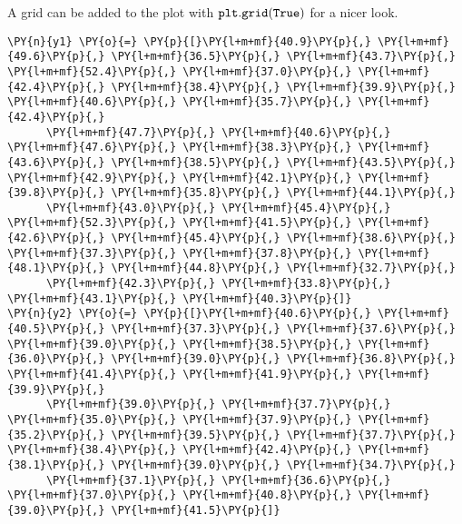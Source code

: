A grid can be added to the plot with \(\tt{plt.grid(True)}\) for a nicer
look.

    \begin{tcolorbox}[breakable, size=fbox, boxrule=1pt, pad at break*=1mm,colback=cellbackground, colframe=cellborder]
\begin{Verbatim}[commandchars=\\\{\}]
\PY{n}{y1} \PY{o}{=} \PY{p}{[}\PY{l+m+mf}{40.9}\PY{p}{,} \PY{l+m+mf}{49.6}\PY{p}{,} \PY{l+m+mf}{36.5}\PY{p}{,} \PY{l+m+mf}{43.7}\PY{p}{,} \PY{l+m+mf}{52.4}\PY{p}{,} \PY{l+m+mf}{37.0}\PY{p}{,} \PY{l+m+mf}{42.4}\PY{p}{,} \PY{l+m+mf}{38.4}\PY{p}{,} \PY{l+m+mf}{39.9}\PY{p}{,} \PY{l+m+mf}{40.6}\PY{p}{,} \PY{l+m+mf}{35.7}\PY{p}{,} \PY{l+m+mf}{42.4}\PY{p}{,} 
      \PY{l+m+mf}{47.7}\PY{p}{,} \PY{l+m+mf}{40.6}\PY{p}{,} \PY{l+m+mf}{47.6}\PY{p}{,} \PY{l+m+mf}{38.3}\PY{p}{,} \PY{l+m+mf}{43.6}\PY{p}{,} \PY{l+m+mf}{38.5}\PY{p}{,} \PY{l+m+mf}{43.5}\PY{p}{,} \PY{l+m+mf}{42.9}\PY{p}{,} \PY{l+m+mf}{42.1}\PY{p}{,} \PY{l+m+mf}{39.8}\PY{p}{,} \PY{l+m+mf}{35.8}\PY{p}{,} \PY{l+m+mf}{44.1}\PY{p}{,} 
      \PY{l+m+mf}{43.0}\PY{p}{,} \PY{l+m+mf}{45.4}\PY{p}{,} \PY{l+m+mf}{52.3}\PY{p}{,} \PY{l+m+mf}{41.5}\PY{p}{,} \PY{l+m+mf}{42.6}\PY{p}{,} \PY{l+m+mf}{45.4}\PY{p}{,} \PY{l+m+mf}{38.6}\PY{p}{,} \PY{l+m+mf}{37.3}\PY{p}{,} \PY{l+m+mf}{37.8}\PY{p}{,} \PY{l+m+mf}{48.1}\PY{p}{,} \PY{l+m+mf}{44.8}\PY{p}{,} \PY{l+m+mf}{32.7}\PY{p}{,} 
      \PY{l+m+mf}{42.3}\PY{p}{,} \PY{l+m+mf}{33.8}\PY{p}{,} \PY{l+m+mf}{43.1}\PY{p}{,} \PY{l+m+mf}{40.3}\PY{p}{]}
\PY{n}{y2} \PY{o}{=} \PY{p}{[}\PY{l+m+mf}{40.6}\PY{p}{,} \PY{l+m+mf}{40.5}\PY{p}{,} \PY{l+m+mf}{37.3}\PY{p}{,} \PY{l+m+mf}{37.6}\PY{p}{,} \PY{l+m+mf}{39.0}\PY{p}{,} \PY{l+m+mf}{38.5}\PY{p}{,} \PY{l+m+mf}{36.0}\PY{p}{,} \PY{l+m+mf}{39.0}\PY{p}{,} \PY{l+m+mf}{36.8}\PY{p}{,} \PY{l+m+mf}{41.4}\PY{p}{,} \PY{l+m+mf}{41.9}\PY{p}{,} \PY{l+m+mf}{39.9}\PY{p}{,} 
      \PY{l+m+mf}{39.0}\PY{p}{,} \PY{l+m+mf}{37.7}\PY{p}{,} \PY{l+m+mf}{35.0}\PY{p}{,} \PY{l+m+mf}{37.9}\PY{p}{,} \PY{l+m+mf}{35.2}\PY{p}{,} \PY{l+m+mf}{39.5}\PY{p}{,} \PY{l+m+mf}{37.7}\PY{p}{,} \PY{l+m+mf}{38.4}\PY{p}{,} \PY{l+m+mf}{42.4}\PY{p}{,} \PY{l+m+mf}{38.1}\PY{p}{,} \PY{l+m+mf}{39.0}\PY{p}{,} \PY{l+m+mf}{34.7}\PY{p}{,} 
      \PY{l+m+mf}{37.1}\PY{p}{,} \PY{l+m+mf}{36.6}\PY{p}{,} \PY{l+m+mf}{37.0}\PY{p}{,} \PY{l+m+mf}{40.8}\PY{p}{,} \PY{l+m+mf}{39.0}\PY{p}{,} \PY{l+m+mf}{41.5}\PY{p}{]}


\end{Verbatim}
\end{tcolorbox}
